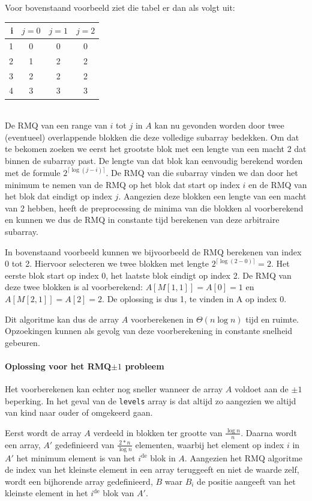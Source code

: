 Voor bovenstaand voorbeeld ziet die tabel er dan als volgt uit:

\begin{tabular}{r|ccc}
	\toprule
	i & $j=0$ & $j=1$ & $j=2$ \\
	\midrule
	1 &   0   &   0   & 0     \\
	2 &   1   &   2   & 2     \\
	3 &   2   &   2   & 2     \\
	4 &   3   &   3   & 3     \\
	\bottomrule
\end{tabular}\\

De RMQ van een range van $i$ tot $j$ in $A$ kan nu gevonden worden door twee
(eventueel) overlappende blokken die deze volledige subarray bedekken. Om dat te
bekomen zoeken we eerst het grootste blok met een lengte van een macht 2 dat
binnen de subarray past. De lengte van dat blok kan eenvoudig berekend worden
met de formule $2^{\lceil \log(j - i) \rceil}$. De RMQ van die subarray vinden
we dan door het minimum te nemen van de RMQ op het blok dat start op index $i$ 
en
de RMQ van het blok dat eindigt op index $j$. Aangezien deze blokken een lengte
van een macht van 2 hebben, heeft de preprocessing de minima van die blokken al
voorberekend en kunnen we dus de RMQ in constante tijd berekenen van deze
arbitraire subarray.

In bovenstaand voorbeeld kunnen we bijvoorbeeld de RMQ berekenen van index 0 
tot 2. Hiervoor selecteren we twee blokken met lengte $2^{\lceil \log(2 - 0) 
\rceil} = 2$. Het eerste blok start op index 0, het laatste blok eindigt op 
index 2. De RMQ van deze twee blokken is al voorberekend: $A[M[1,1]] = A[0] = 
1$ en $A[M[2,1]] = A[2] = 2$. De oplossing is dus 1, te vinden in A op index 0.

Dit algoritme kan dus de array $A$ voorberekenen in $\Theta(n\log{n})$ tijd en
ruimte. Opzoekingen kunnen als gevolg van deze voorberekening in constante
snelheid gebeuren.

\paragraph{Oplossing voor het RMQ$\pm1$ probleem}
Het voorberekenen kan echter nog sneller wanneer de array $A$ voldoet aan de
$\pm1$ beperking. In het geval van de \texttt{levels} array is dat altijd zo
aangezien we altijd van kind naar ouder of omgekeerd gaan.

Eerst wordt de array $A$ verdeeld in blokken ter grootte van
$\frac{\log{n}}{n}$. Daarna wordt een array, $A'$ gedefinieerd van
$\frac{2*n}{\log{n}}$ elementen, waarbij het element op index $i$ in $A'$ het
minimum element is van het $i^\text{de}$ blok in $A$. Aangezien het RMQ
algoritme de index van het kleinste element in een array teruggeeft en niet de
waarde zelf, wordt een bijhorende array gedefinieerd, $B$ waar $B_i$ de positie
aangeeft van het kleinste element in het $i^\text{de}$ blok van $A'$.

